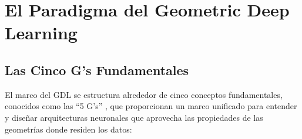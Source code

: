 \section{El Paradigma del Geometric Deep Learning}\label{sec:paradigma_gdl}

\subsection{Las Cinco G's Fundamentales}\label{subsec:cinco_gs}

El marco del \gls{GDL} se estructura alrededor de cinco conceptos fundamentales, conocidos como las ``5 G's'' \citep{bronstein2017geometricdeeplearning}, que proporcionan un marco unificado para entender y diseñar arquitecturas neuronales que aprovecha las propiedades de las geometrías donde residen los datos:

